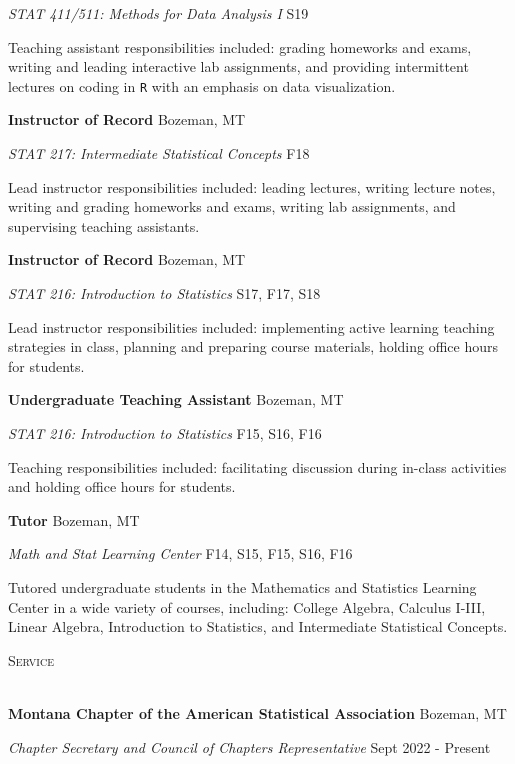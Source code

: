 \documentclass[a4paper]{article}
\newcommand{\lineunder} {
	\vspace*{-8pt} \\
	\hspace*{-18pt} \hrulefill \\
}
\newcommand{\header} [1] {
	{\hspace*{-18pt}\vspace*{6pt} \textcolor{Cerulean}{\textsc{#1}}}
	\vspace*{-6pt} \textcolor{Cerulean}{\lineunder}
}
\begin{document}
\emph{STAT 411/511: Methods for Data Analysis I} \hfill S19

Teaching assistant responsibilities included: grading homeworks and
exams, writing and leading interactive lab assignments, and providing
intermittent lectures on coding in \texttt{R} with an emphasis on data
visualization. \vspace*{2mm}

\textbf{Instructor of Record} \hfill Bozeman, MT

\emph{STAT 217: Intermediate Statistical Concepts} \hfill F18

Lead instructor responsibilities included: leading lectures, writing
lecture notes, writing and grading homeworks and exams, writing lab
assignments, and supervising teaching assistants. \vspace*{2mm}

\textbf{Instructor of Record} \hfill Bozeman, MT

\emph{STAT 216: Introduction to Statistics} \hfill S17, F17, S18

Lead instructor responsibilities included: implementing active learning
teaching strategies in class, planning and preparing course materials,
holding office hours for students. \vspace*{2mm}

\textbf{Undergraduate Teaching Assistant} \hfill Bozeman, MT

\emph{STAT 216: Introduction to Statistics} \hfill F15, S16, F16

Teaching responsibilities included: facilitating discussion during
in-class activities and holding office hours for students. \vspace*{2mm}

\textbf{Tutor} \hfill Bozeman, MT

\emph{Math and Stat Learning Center} \hfill F14, S15, F15, S16, F16

Tutored undergraduate students in the Mathematics and Statistics
Learning Center in a wide variety of courses, including: College
Algebra, Calculus I-III, Linear Algebra, Introduction to Statistics, and
Intermediate Statistical Concepts.\vspace*{2mm}

\header{Service}

\textbf{Montana Chapter of the American Statistical Association}
\hfill Bozeman, MT

\emph{Chapter Secretary and Council of Chapters Representative}
\hfill Sept 2022 - Present
\end{document}
